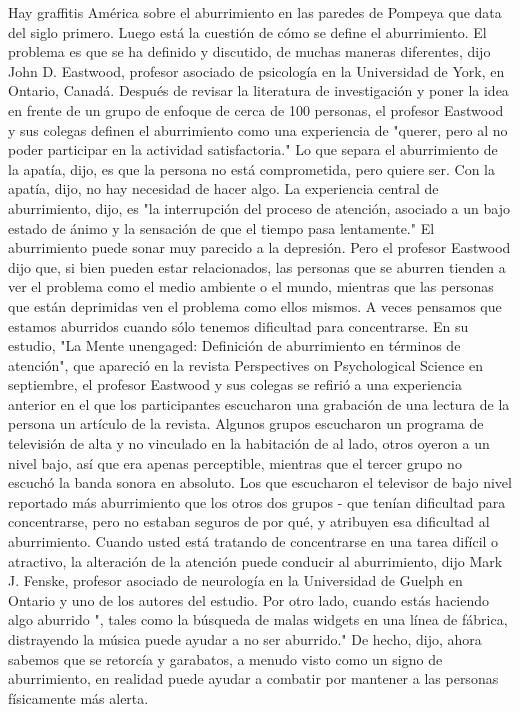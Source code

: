 Hay graffitis América sobre el aburrimiento en las paredes de Pompeya que data del siglo primero.
Luego está la cuestión de cómo se define el aburrimiento.
El problema es que se ha definido y discutido, de muchas maneras diferentes, dijo John D. Eastwood, profesor asociado de psicología en la Universidad de York, en Ontario, Canadá.
Después de revisar la literatura de investigación y poner la idea en frente de un grupo de enfoque de cerca de 100 personas, el profesor Eastwood y sus colegas definen el aburrimiento como una experiencia de "querer, pero al no poder participar en la actividad satisfactoria."
Lo que separa el aburrimiento de la apatía, dijo, es que la persona no está comprometida, pero quiere ser.
Con la apatía, dijo, no hay necesidad de hacer algo.
La experiencia central de aburrimiento, dijo, es "la interrupción del proceso de atención, asociado a un bajo estado de ánimo y la sensación de que el tiempo pasa lentamente."
El aburrimiento puede sonar muy parecido a la depresión.
Pero el profesor Eastwood dijo que, si bien pueden estar relacionados, las personas que se aburren tienden a ver el problema como el medio ambiente o el mundo, mientras que las personas que están deprimidas ven el problema como ellos mismos.
A veces pensamos que estamos aburridos cuando sólo tenemos dificultad para concentrarse.
En su estudio, "La Mente unengaged: Definición de aburrimiento en términos de atención", que apareció en la revista Perspectives on Psychological Science en septiembre, el profesor Eastwood y sus colegas se refirió a una experiencia anterior en el que los participantes escucharon una grabación de una lectura de la persona un artículo de la revista.
Algunos grupos escucharon un programa de televisión de alta y no vinculado en la habitación de al lado, otros oyeron a un nivel bajo, así que era apenas perceptible, mientras que el tercer grupo no escuchó la banda sonora en absoluto.
Los que escucharon el televisor de bajo nivel reportado más aburrimiento que los otros dos grupos - que tenían dificultad para concentrarse, pero no estaban seguros de por qué, y atribuyen esa dificultad al aburrimiento.
Cuando usted está tratando de concentrarse en una tarea difícil o atractivo, la alteración de la atención puede conducir al aburrimiento, dijo Mark J. Fenske, profesor asociado de neurología en la Universidad de Guelph en Ontario y uno de los autores del estudio.
Por otro lado, cuando estás haciendo algo aburrido ", tales como la búsqueda de malas widgets en una línea de fábrica, distrayendo la música puede ayudar a no ser aburrido."
De hecho, dijo, ahora sabemos que se retorcía y garabatos, a menudo visto como un signo de aburrimiento, en realidad puede ayudar a combatir por mantener a las personas físicamente más alerta.
